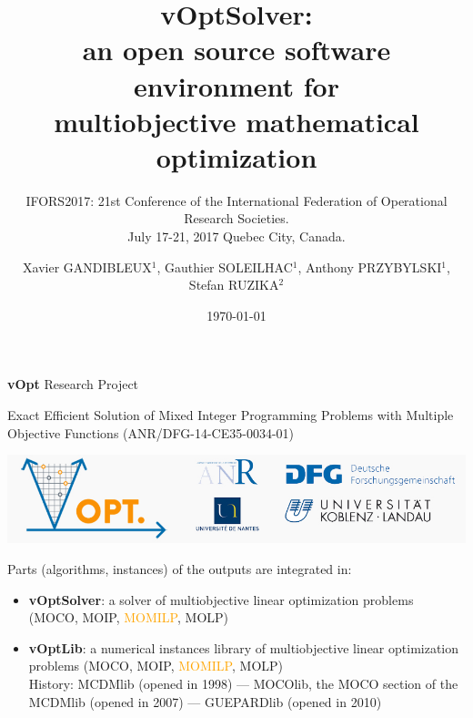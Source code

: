 \documentclass[10pt,xcolor=dvipsnames]{beamer}
\title{{{\large vOptSolver: \vspace{-0mm}\\ 
an open source software environment for \\ 
multiobjective mathematical optimization\\}}}
\subtitle{\scriptsize{IFORS2017: 21st Conference of the International Federation of Operational Research Societies.  \vspace{-2mm}\\%
July 17-21, 2017 Quebec City, Canada.}}
\date{\today}
\author{Xavier GANDIBLEUX$^1$, 
Gauthier SOLEILHAC$^1$, 
Anthony    PRZYBYLSKI$^1$,\\
Stefan    RUZIKA$^2$}
\institute{Universit\'e de Nantes, France$^1$ -- University of Koblenz-Landau, Germany$^2$}
\newcommand{\orange}{\textcolor{orange}}
\begin{document}
\maketitle

\begin{frame}{}

\vspace{6mm}
{\Large \textbf{vOpt} Research Project}

\footnotesize{
Exact Efficient Solution of Mixed Integer Programming Problems with Multiple Objective Functions}
%
(ANR/DFG-14-CE35-0034-01)


\vspace{8mm}
  \includegraphics{logovopt5.jpg}
\vspace{8mm}



\footnotesize{
Parts (algorithms, instances) of the outputs are integrated in:
\begin{itemize}
\item \textbf{vOptSolver}: a solver of multiobjective linear optimization problems (MOCO, MOIP, \orange{MOMILP}, MOLP)
\vspace{3mm}

\item \textbf{vOptLib}: a numerical instances library of multiobjective linear optimization problems (MOCO, MOIP, \orange{MOMILP}, MOLP)\\
\smallskip
History: MCDMlib (opened in 1998) --- MOCOlib, the MOCO section of the MCDMlib (opened in 2007) --- GUEPARDlib (opened in 2010)


\end{itemize}
}

\end{frame}

%
%
%
\end{document}

